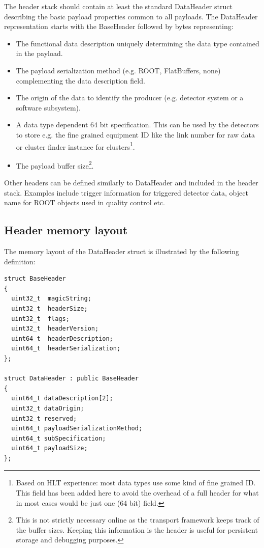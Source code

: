 \documentclass[a4paper,twoside]{article}
\begin{document}
The header stack should contain at least the standard DataHeader struct describing the basic payload properties common to all payloads. The DataHeader representation starts with the BaseHeader followed by bytes representing:
\begin{itemize}
  \item The functional data description uniquely determining the data type contained in the payload.
  \item The payload serialization method (e.g. ROOT, FlatBuffers, none) complementing the data description field.
  \item The origin of the data to identify the producer (e.g. detector system or a software subsystem).
  \item A data type dependent 64 bit specification. This can be used by the detectors to store e.g. the fine grained equipment ID like the link number for raw data or cluster finder instance for clusters\footnote{Based on HLT experience: most data types use some kind of fine grained ID. This field has been added here to avoid the overhead of a full header for what in most cases would be just one (64 bit) field.}.
  \item The payload buffer size\footnote{This is not strictly necessary online as the transport framework keeps track of the buffer sizes. Keeping this information is the header is useful for persistent storage and debugging purposes.}.
\end{itemize}

Other headers can be defined similarly to DataHeader and included in the header stack. Examples include trigger information for triggered detector data, object name for ROOT objects used in quality control etc.

\subsection{Header memory layout}
The memory layout of the DataHeader struct is illustrated by the following definition:

\lstset{language=C++
}
\begin{lstlisting}
struct BaseHeader
{
  uint32_t  magicString;
  uint32_t  headerSize;
  uint32_t  flags;
  uint32_t  headerVersion;
  uint64_t  headerDescription;
  uint64_t  headerSerialization;
};

struct DataHeader : public BaseHeader
{
  uint64_t dataDescription[2];
  uint32_t dataOrigin;
  uint32_t reserved;
  uint64_t payloadSerializationMethod;
  uint64_t subSpecification;
  uint64_t payloadSize;
};

\end{lstlisting}
\end{document}
